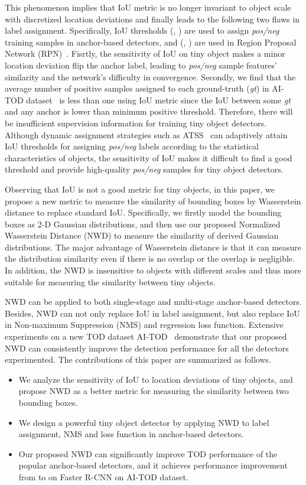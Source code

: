 \documentclass{article}
\begin{document}
This phenomenon implies that IoU metric is no longer invariant to object scale with discretized location deviations and finally leads to the following two flaws in label assignment. Specifically, IoU thresholds (, ) are used to assign \textit{pos/neg} training samples in anchor-based detectors, and (, ) are used in Region Proposal Network (RPN)~\cite{Fast-R-CNN_2015_ICCV}. Fisrtly, the sensitivity of IoU on tiny object makes a minor location deviation flip the anchor label, leading to \textit{pos/neg} sample features' similarity and the network's difficulty in convergence. Secondly, we find that the average number of positive samples assigned to each ground-truth (\textit{gt}) in AI-TOD dataset~\cite{AI-TOD_2020_ICPR} is less than one using IoU metric since the IoU between some \textit{gt} and any anchor is lower than minimum positive threshold. Therefore, there will be insufficient supervision information for training tiny object detectors. Although dynamic assignment strategies such as ATSS~\cite{atss_2020_cvpr} can adaptively attain IoU thresholds for assigning \textit{pos/neg} labels according to the statistical characteristics of objects, 
the sensitivity of IoU makes it difficult to find a good threshold and provide high-quality \textit{pos/neg} samples for tiny object detectors. 

Observing that IoU is not a good metric for tiny objects, in this paper, we propose a new metric to measure the similarity of bounding boxes by Wasserstein distance to replace standard IoU. Specifically, we firstly model the bounding boxes as 2-D Gaussian distributions, and then use our proposed Normalized Wasserstein Distance (NWD) to measure the similarity of derived Gaussian distributions. The major advantage of Wasserstein distance is that it can measure the distribution similarity even if there is no overlap or the overlap is negligible. In addition, the NWD is insensitive to objects with different scales and thus more suitable for measuring the similarity between tiny objects.

NWD can be applied to both single-stage and multi-stage anchor-based detectors. Besides, NWD can not only replace IoU in label assignment, but also replace IoU in Non-maximum Suppression (NMS) and regression loss function. Extensive experiments on a new TOD dataset AI-TOD~\cite{AI-TOD_2020_ICPR} demonstrate that our proposed NWD can consistently improve the detection performance for all the detectors experimented. The contributions of this paper are summarized as follows.
\begin{itemize}[leftmargin=*]
    \item We analyze the sensitivity of IoU to location deviations of tiny objects, and propose NWD as a better metric for measuring the similarity between two bounding boxes.
    \item We design a powerful tiny object detector by applying NWD to label assignment, NMS and loss function in anchor-based detectors.
    \item Our proposed NWD can significantly improve TOD performance of the popular anchor-based detectors, and it achieves performance improvement from  to  on Faster R-CNN on AI-TOD dataset.
\end{itemize}
\end{document}
